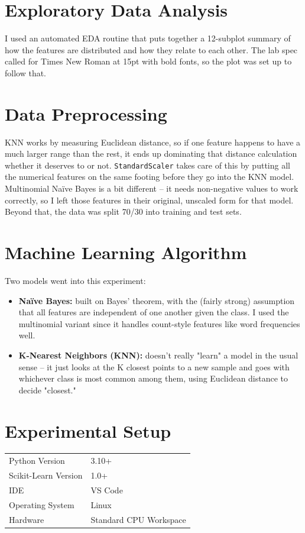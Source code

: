 \documentclass[12pt,a4paper]{article}
\begin{document}
\section{Exploratory Data Analysis}
I used an automated EDA routine that puts together a 12-subplot summary of how the features are distributed and how they relate to each other. The lab spec called for Times New Roman at 15pt with bold fonts, so the plot was set up to follow that.

\section{Data Preprocessing}
KNN works by measuring Euclidean distance, so if one feature happens to have a much larger range than the rest, it ends up dominating that distance calculation whether it deserves to or not. \texttt{StandardScaler} takes care of this by putting all the numerical features on the same footing before they go into the KNN model. Multinomial Naïve Bayes is a bit different -- it needs non-negative values to work correctly, so I left those features in their original, unscaled form for that model. Beyond that, the data was split 70/30 into training and test sets.

\section{Machine Learning Algorithm}
Two models went into this experiment:
\begin{itemize}
    \item \textbf{Naïve Bayes:} built on Bayes' theorem, with the (fairly strong) assumption that all features are independent of one another given the class. I used the multinomial variant since it handles count-style features like word frequencies well.
    \item \textbf{K-Nearest Neighbors (KNN):} doesn't really "learn" a model in the usual sense -- it just looks at the K closest points to a new sample and goes with whichever class is most common among them, using Euclidean distance to decide "closest."
\end{itemize}

\section{Experimental Setup}
\begin{tabular}{ll}
\toprule
Python Version & 3.10+ \\
Scikit-Learn Version & 1.0+ \\
IDE & VS Code \\
Operating System & Linux \\
Hardware & Standard CPU Workspace \\
\bottomrule
\end{tabular}
\end{document}
